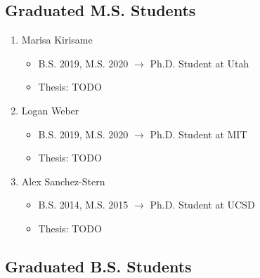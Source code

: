 \documentclass[10pt]{article}
\begin{document}
\subsection*{Graduated M.S. Students}

\begin{enumerate}[resume]
  \item Marisa Kirisame
    \begin{itemize}
      \item B.S. 2019, M.S. 2020 $\rightarrow$ Ph.D. Student at Utah
      \item Thesis: TODO
    \end{itemize}

  \item Logan Weber
    \begin{itemize}
      \item B.S. 2019, M.S. 2020 $\rightarrow$ Ph.D. Student at MIT
      \item Thesis: TODO
    \end{itemize}

  \item Alex Sanchez-Stern
    \begin{itemize}
      \item B.S. 2014, M.S. 2015 $\rightarrow$ Ph.D. Student at UCSD
      \item Thesis: TODO
    \end{itemize}
\end{enumerate}

\subsection*{Graduated B.S. Students}
\end{document}
